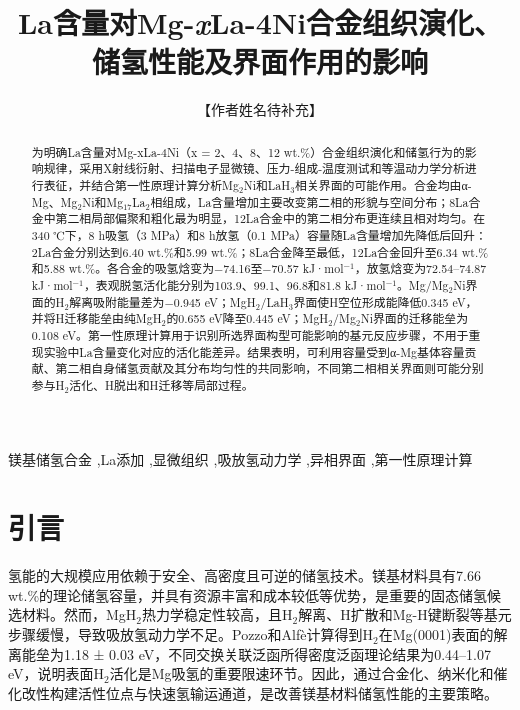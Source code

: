 \documentclass[preprint,12pt]{elsarticle}
\begin{document}
\begin{frontmatter}
\title{{\fontsize{18}{22}\selectfont La含量对Mg-\textit{x}La-4Ni合金组织演化、储氢性能及界面作用的影响}}
\author[aff1]{【作者姓名待补充】}
\begin{abstract}
为明确La含量对Mg-xLa-4Ni（x = 2、4、8、12 wt.\%）合金组织演化和储氢行为的影响规律，采用X射线衍射、扫描电子显微镜、压力-组成-温度测试和等温动力学分析进行表征，并结合第一性原理计算分析Mg$_{\mathrm{2}}$Ni和LaH$_{\mathrm{3}}$相关界面的可能作用。合金均由α-Mg、Mg$_{\mathrm{2}}$Ni和Mg$_{\mathrm{17}}$La$_{\mathrm{2}}$相组成，La含量增加主要改变第二相的形貌与空间分布；8La合金中第二相局部偏聚和粗化最为明显，12La合金中的第二相分布更连续且相对均匀。在340 ℃下，8 h吸氢（3 MPa）和8 h放氢（0.1 MPa）容量随La含量增加先降低后回升：2La合金分别达到6.40 wt.\%和5.99 wt.\%；8La合金降至最低，12La合金回升至6.34 wt.\%和5.88 wt.\%。各合金的吸氢焓变为−74.16至−70.57 kJ·mol$^{-1}$，放氢焓变为72.54–74.87 kJ·mol$^{-1}$，表观脱氢活化能分别为103.9、99.1、96.8和81.8 kJ·mol$^{-1}$。Mg/Mg$_{\mathrm{2}}$Ni界面的H$_{\mathrm{2}}$解离吸附能量差为−0.945 eV；MgH$_{\mathrm{2}}$/LaH$_{\mathrm{3}}$界面使H空位形成能降低0.345 eV，并将H迁移能垒由纯MgH$_{\mathrm{2}}$的0.655 eV降至0.445 eV；MgH$_{\mathrm{2}}$/Mg$_{\mathrm{2}}$Ni界面的迁移能垒为0.108 eV。第一性原理计算用于识别所选界面构型可能影响的基元反应步骤，不用于重现实验中La含量变化对应的活化能差异。结果表明，可利用容量受到α-Mg基体容量贡献、第二相自身储氢贡献及其分布均匀性的共同影响，不同第二相相关界面则可能分别参与H$_{\mathrm{2}}$活化、H脱出和H迁移等局部过程。
\end{abstract}
\begin{keyword}
镁基储氢合金 \sep La添加 \sep 显微组织 \sep 吸放氢动力学 \sep 异相界面 \sep 第一性原理计算
\end{keyword}
\end{frontmatter}
\fontsize{10.5}{18}\selectfont

\section{引言}

氢能的大规模应用依赖于安全、高密度且可逆的储氢技术。镁基材料具有7.66 wt.\%的理论储氢容量，并具有资源丰富和成本较低等优势，是重要的固态储氢候选材料。然而，MgH$_{\mathrm{2}}$热力学稳定性较高，且H$_{\mathrm{2}}$解离、H扩散和Mg-H键断裂等基元步骤缓慢，导致吸放氢动力学不足。Pozzo和Alfè计算得到H$_{\mathrm{2}}$在Mg(0001)表面的解离能垒为1.18 ± 0.03 eV，不同交换关联泛函所得密度泛函理论结果为0.44–1.07 eV，说明表面H$_{\mathrm{2}}$活化是Mg吸氢的重要限速环节\cite{ref1}。因此，通过合金化、纳米化和催化改性构建活性位点与快速氢输运通道，是改善镁基材料储氢性能的主要策略\cite{ref2,ref3,ref4}。
\end{document}
